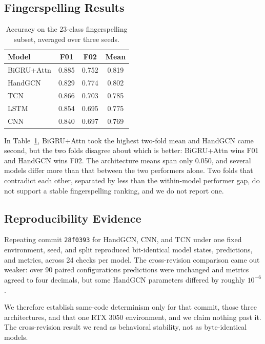 \subsection{Fingerspelling Results}

\begin{table}[htbp]
\centering
\caption{Accuracy on the 23-class fingerspelling subset, averaged over three seeds.}
\label{tab:fingerspelling}
\small
\setlength{\tabcolsep}{7pt}
\renewcommand{\arraystretch}{1.08}
\begin{tabular}{lccc}
\toprule
\textbf{Model} & \textbf{F01} & \textbf{F02} & \textbf{Mean} \\
\midrule
BiGRU+Attn & 0.885 & 0.752 & 0.819 \\
HandGCN & 0.829 & 0.774 & 0.802 \\
TCN & 0.866 & 0.703 & 0.785 \\
LSTM & 0.854 & 0.695 & 0.775 \\
CNN & 0.840 & 0.697 & 0.769 \\
\bottomrule
\end{tabular}
\end{table}

In Table~\ref{tab:fingerspelling}, BiGRU+Attn took the highest two-fold mean and HandGCN came second, but the two folds disagree about which is better: BiGRU+Attn wins F01 and HandGCN wins F02. The architecture means span only 0.050, and several models differ more than that between the two performers alone. Two folds that contradict each other, separated by less than the within-model performer gap, do not support a stable fingerspelling ranking, and we do not report one.

\subsection{Reproducibility Evidence}

Repeating commit \texttt{28f0393} for HandGCN, CNN, and TCN under one fixed environment, seed, and split reproduced bit-identical model states, predictions, and metrics, across 24 checks per model. The cross-revision comparison came out weaker: over 90 paired configurations predictions were unchanged and metrics agreed to four decimals, but some HandGCN parameters differed by roughly $10^{-6}$.

We therefore establish same-code determinism only for that commit, those three architectures, and that one RTX 3050 environment, and we claim nothing past it. The cross-revision result we read as behavioral stability, not as byte-identical models.